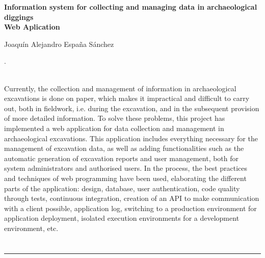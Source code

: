 \cleardoublepage
\thispagestyle{empty}


\begin{center}
	{\large\bfseries Information system for collecting and managing data in archaeological diggings\\ Web Aplication}\\
\end{center}
\begin{center}
	Joaquín Alejandro España Sánchez\\
\end{center}
\vspace{0.5cm}
. \\
\vspace{0.7cm}

 \\

Currently, the collection and management of information in archaeological excavations is done on paper, which makes it impractical and difficult to carry out, both in fieldwork, i.e. during the
excavation, and in the subsequent provision of more detailed information. To solve these problems, this project has implemented a web application for data collection and management in archaeological
excavations. This application includes everything necessary for the management of excavation data, as well as adding functionalities such as the automatic generation of excavation reports and user
management, both for system administrators and authorised users. In the process, the best practices and techniques of web programming have been used, elaborating the different parts of the application:
design, database, user authentication, code quality through tests, continuous integration, creation of an API to make communication with a client possible, application log, switching to a production
environment for application deployment, isolated execution environments for a development environment, etc.


\chapter*{}
\thispagestyle{empty}

\noindent\rule[-1ex]{\textwidth}{2pt}\\[4.5ex]

